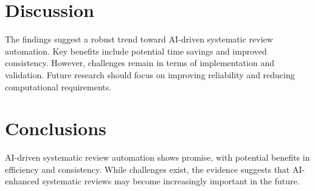 \documentclass{article}%
\begin{document}
%
\section{Discussion}%
\label{sec:Discussion}%
The findings suggest a robust trend toward AI{-}driven systematic review automation. %
Key benefits include potential time savings and improved consistency. %
However, challenges remain in terms of implementation and validation. %
Future research should focus on improving reliability and reducing computational requirements.

%
\section{Conclusions}%
\label{sec:Conclusions}%
AI{-}driven systematic review automation shows promise, with potential benefits in efficiency and consistency. %
While challenges exist, the evidence suggests that AI{-}enhanced systematic reviews may become increasingly important in the future.

%
\end{document}
